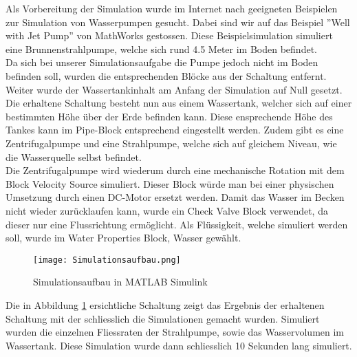 Als Vorbereitung der Simulation wurde im Internet nach geeigneten Beispielen zur Simulation von Wasserpumpen gesucht. Dabei sind wir auf das Beispiel ''Well with Jet Pump'' \cite{MathWorks_JetPump} von MathWorks gestossen. Diese Beispielsimulation simuliert eine Brunnenstrahlpumpe, welche sich rund 4.5 Meter im Boden befindet.\\

Da sich bei unserer Simulationsaufgabe die Pumpe jedoch nicht im Boden befinden soll, wurden die entsprechenden Blöcke aus der Schaltung entfernt. Weiter wurde der Wassertankinhalt am Anfang der Simulation auf Null gesetzt. Die erhaltene Schaltung besteht nun aus einem Wassertank, welcher sich auf einer bestimmten Höhe über der Erde befinden kann. Diese ensprechende Höhe des Tankes kann im Pipe-Block entsprechend eingestellt werden. Zudem gibt es eine Zentrifugalpumpe und eine Strahlpumpe, welche sich auf gleichem Niveau, wie die Wasserquelle selbst befindet.\\

Die Zentrifugalpumpe wird wiederum durch eine mechanische Rotation mit dem Block Velocity Source simuliert. Dieser Block würde man bei einer physischen Umsetzung durch einen DC-Motor ersetzt werden. Damit das Wasser im Becken nicht wieder zurücklaufen kann, wurde ein Check Valve Block verwendet, da dieser nur eine Flussrichtung ermöglicht. Als Flüssigkeit, welche simuliert werden soll, wurde im Water Properties Block, Wasser gewählt.\\

\begin{figure}[htb]
\texttt{[image: Simulationsaufbau.png]}
\caption{Simulationsaufbau in MATLAB Simulink}
\label{fig:Simulationsaufbau in MATLAB Simulink}
\end{figure}

Die in Abbildung \ref{fig:Simulationsaufbau in MATLAB Simulink} ersichtliche Schaltung zeigt das Ergebnis der erhaltenen Schaltung mit der schliesslich die Simulationen gemacht wurden. Simuliert wurden die einzelnen Fliessraten der Strahlpumpe, sowie das Wasservolumen im Wassertank. Diese Simulation wurde dann schliesslich 10 Sekunden lang simuliert.
